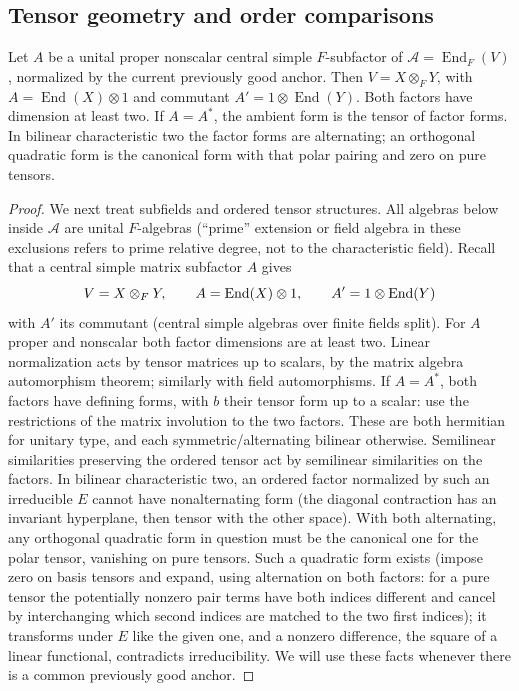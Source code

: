 \subsection{Tensor geometry and order comparisons}

\begin{lemma}\label{c:tensor-forms}
Let \(A\) be a unital proper nonscalar central simple \(F\)-subfactor of \(\mathcal A=\operatorname{End}_F(V)\), normalized by the current previously good anchor. Then \(V=X\otimes_FY\), with \(A=\operatorname{End}(X)\otimes1\) and commutant \(A'=1\otimes\operatorname{End}(Y)\). Both factors have dimension at least two. If \(A=A^*\), the ambient form is the tensor of factor forms. In bilinear characteristic two the factor forms are alternating; an orthogonal quadratic form is the canonical form with that polar pairing and zero on pure tensors.
\end{lemma}

\begin{proof}
We next treat subfields and ordered tensor structures. All algebras below inside \(\mathcal A\) are unital \(F\)-algebras (``prime'' extension or field algebra in these exclusions refers to prime relative degree, not to the characteristic field). Recall that a central simple matrix subfactor \(A\) gives
\[
 V=X\otimes_F Y,\qquad A={\rm End}(X)\otimes1,\qquad A'=1\otimes{\rm End}(Y)
\]
with \(A'\) its commutant (central simple algebras over finite fields split). For \(A\) proper and nonscalar both factor dimensions are at least two. Linear normalization acts by tensor matrices up to scalars, by the matrix algebra automorphism theorem; similarly with field automorphisms. If \(A=A^*\), both factors have defining forms, with \(b\) their tensor form up to a scalar: use the restrictions of the matrix involution to the two factors. These are both hermitian for unitary type, and each symmetric/alternating bilinear otherwise. Semilinear similarities preserving the ordered tensor act by semilinear similarities on the factors. In bilinear characteristic two, an ordered factor normalized by such an irreducible \(E\) cannot have nonalternating form (the diagonal contraction has an invariant hyperplane, then tensor with the other space). With both alternating, any orthogonal quadratic form in question must be the canonical one for the polar tensor, vanishing on pure tensors. Such a quadratic form exists (impose zero on basis tensors and expand, using alternation on both factors: for a pure tensor the potentially nonzero pair terms have both indices different and cancel by interchanging which second indices are matched to the two first indices); it transforms under \(E\) like the given one, and a nonzero difference, the square of a linear functional, contradicts irreducibility. We will use these facts whenever there is a common previously good anchor.
\end{proof}

